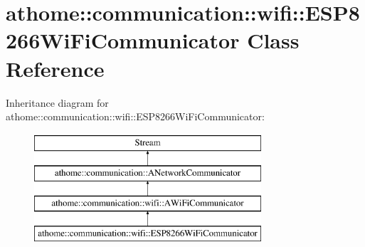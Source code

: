 \hypertarget{classathome_1_1communication_1_1wifi_1_1_e_s_p8266_wi_fi_communicator}{}\section{athome\+:\+:communication\+:\+:wifi\+:\+:E\+S\+P8266\+Wi\+Fi\+Communicator Class Reference}
\label{classathome_1_1communication_1_1wifi_1_1_e_s_p8266_wi_fi_communicator}
Inheritance diagram for athome\+:\+:communication\+:\+:wifi\+:\+:E\+S\+P8266\+Wi\+Fi\+Communicator\+:\begin{figure}[H]
\begin{center}
\leavevmode
\includegraphics[height=4.000000cm]{classathome_1_1communication_1_1wifi_1_1_e_s_p8266_wi_fi_communicator}
\end{center}
\end{figure}
